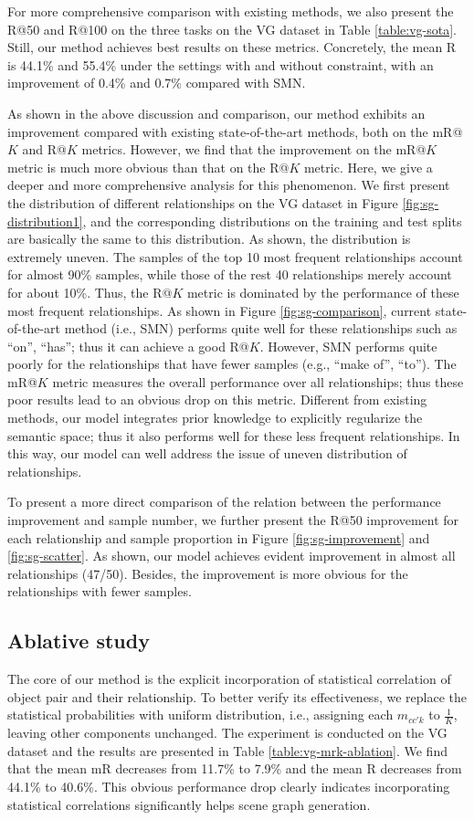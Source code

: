 \documentclass[10pt,twocolumn,letterpaper]{article}
\begin{document}
For more comprehensive comparison with existing methods, we also present the R@50 and R@100 on the three tasks on the VG dataset in Table \ref{table:vg-sota}. Still, our method achieves best results on these metrics. Concretely, the mean R is 44.1\% and 55.4\% under the settings with and without constraint, with an improvement of 0.4\% and 0.7\% compared with SMN.

As shown in the above discussion and comparison, our method exhibits an improvement compared with existing state-of-the-art methods, both on the mR@$K$ and R@$K$ metrics. However, we find that the improvement on the mR@$K$ metric is much more obvious than that on the R@$K$ metric. Here, we give a deeper and more comprehensive analysis for this phenomenon. We first present the distribution of different relationships on the VG dataset in Figure \ref{fig:sg-distribution1}, and the corresponding distributions on the training and test splits are basically the same to this distribution. As shown, the distribution is extremely uneven. The samples of the top 10 most frequent relationships account for almost 90\% samples, while those of the rest 40 relationships merely account for about 10\%. Thus, the R@$K$ metric is dominated by the performance of these most frequent relationships. As shown in Figure \ref{fig:sg-comparison}, current state-of-the-art method (i.e., SMN) performs quite well for these relationships such as ``on'', ``has''; thus it can achieve a good R@$K$. However, SMN performs quite poorly for the relationships that have fewer samples (e.g., ``make of'', ``to''). The mR@$K$ metric measures the overall performance over all relationships; thus these poor results lead to an obvious drop on this metric. Different from existing methods, our model integrates prior knowledge to explicitly regularize the semantic space; thus it also performs well for these less frequent relationships. In this way, our model can well address the issue of uneven distribution of relationships.

To present a more direct comparison of the relation between the performance improvement and sample number, we further present the R@50 improvement for each relationship and sample proportion in Figure \ref{fig:sg-improvement} and \ref{fig:sg-scatter}. As shown, our model achieves evident improvement in almost all relationships (47/50). Besides, the improvement is more obvious for the relationships with fewer samples.

\subsection{Ablative study}
The core of our method is the explicit incorporation of statistical correlation of object pair and their relationship. To better verify its effectiveness, we replace the statistical probabilities with uniform distribution, i.e., assigning each $m_{cc'k}$ to $\frac{1}{K}$, leaving other components unchanged. The experiment is conducted on the VG dataset and the results are presented in Table \ref{table:vg-mrk-ablation}. We find that the mean mR decreases from 11.7\% to 7.9\% and the mean R decreases from 44.1\% to 40.6\%. This obvious performance drop clearly indicates incorporating statistical correlations significantly helps scene graph generation. 
\end{document}
